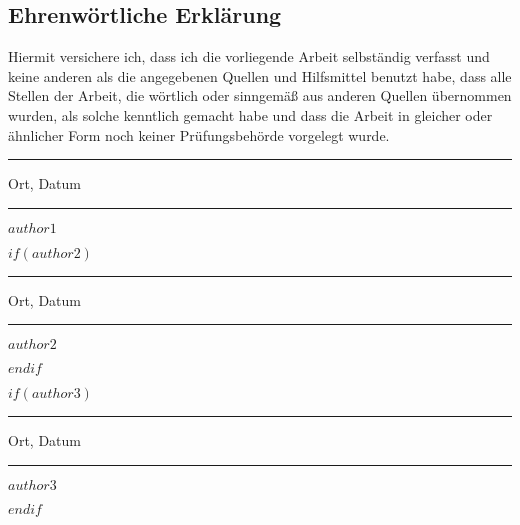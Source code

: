 \documentclass[
$if(fontsize)$
  $fontsize$,
$endif$
$if(lang)$
  $babel-lang$,
$endif$
$if(papersize)$
  $papersize$paper,
$endif$
$for(classoption)$
  $classoption$$sep$,
$endfor$
]{$documentclass$}
\begin{document}
\newpage
\begin{frame}
	
\thispagestyle{empty} %


\ifstrequal{$lang$}{en-us}{
\section*{Statutory Declaration}
}{	
\section*{Ehrenw\"ortliche Erkl\"arung}
}



\vspace{1.5cm}
Hiermit versichere ich, dass ich die vorliegende Arbeit selbständig verfasst und keine anderen als die angegebenen Quellen und Hilfsmittel benutzt habe, dass alle Stellen der Arbeit, die wörtlich oder sinngemäß aus anderen Quellen übernommen wurden, als solche kenntlich gemacht habe und dass die Arbeit in gleicher oder ähnlicher Form noch keiner Prüfungsbehörde vorgelegt wurde.

\vspace{3cm}

\parbox{4cm}{\centering \hrule
	\strut \centering\footnotesize Ort, Datum} \hfill\parbox{4cm}{\hrule
	\strut \centering\footnotesize $author1$}

\vspace{3cm}

$if(author2)$

\parbox{4cm}{\centering \hrule
	\strut \centering\footnotesize Ort, Datum} \hfill\parbox{4cm}{\hrule
	\strut \centering\footnotesize $author2$}


$endif$

\vspace{3cm}

$if(author3)$

\parbox{4cm}{\centering \hrule
	\strut \centering\footnotesize Ort, Datum} \hfill\parbox{4cm}{\hrule
	\strut \centering\footnotesize $author3$}

$endif$

\vspace{3cm}
\end{frame}
\end{document}

